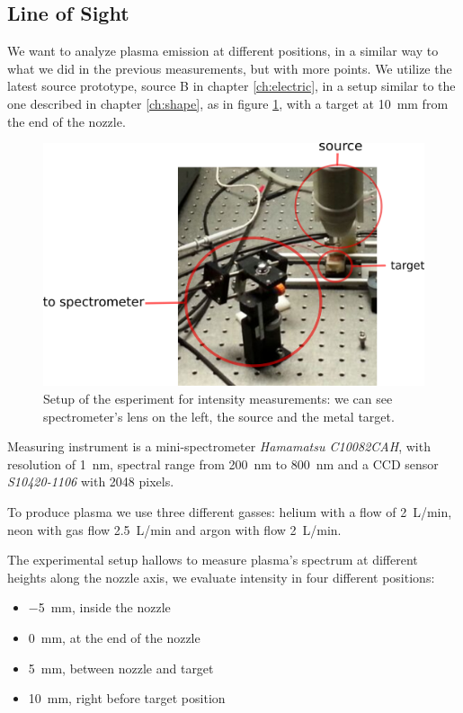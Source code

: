 \subsection{Line of Sight}
We want to analyze plasma emission at different positions, in a similar way to what we did in the previous measurements, but with more points.
We utilize the latest source prototype, source B in chapter \ref{ch:electric}, in a setup similar to the one described in chapter \ref{ch:shape}, as in figure \ref{fig:app2}, with a target at \SI{10}{\milli\meter} from the end of the nozzle.
\begin{figure}
\centering
\includegraphics[width=.7\textwidth]{Images/Spectroscopy/app2_lines.png}
\caption{Setup of the esperiment for intensity measurements: we can see spectrometer's lens on the left, the source and the metal target.}
\label{fig:app2}
\end{figure}


Measuring instrument is a mini-spectrometer \emph{Hamamatsu C10082CAH}, with resolution of \SI{1}{\nano\meter}, spectral range from \SI{200}{\nano\meter} to \SI{800}{\nano\meter} and a CCD sensor \emph{S10420-1106} with \num{2048} pixels.

To produce plasma we use three different gasses: helium with a flow of \SI{2}{\liter/\minute}, neon with gas flow \SI{2.5}{\liter/\minute} and argon with flow \SI{2}{\liter/\minute}.

The experimental setup hallows to measure plasma's spectrum at different heights along the nozzle axis, we evaluate intensity in four different positions:
\begin{itemize}
 \item \SI{-5}{\milli\meter}, inside the nozzle
 \item \SI{0}{\milli\meter}, at the end of the nozzle
 \item \SI{5}{\milli\meter}, between nozzle and target
 \item \SI{10}{\milli\meter}, right before target position
\end{itemize}


